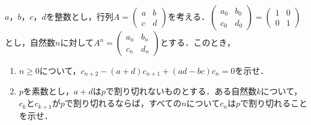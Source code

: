 \documentclass[../../main.tex]{subfiles}
\begin{document}
$a$，$b$，$c$，$d$を整数とし，行列$A=
\begin{pmatrix} a&b \\ c&d
\end{pmatrix}$を考える．$
\begin{pmatrix} a_0&b_0 \\ c_0&d_0
\end{pmatrix}=
\begin{pmatrix} 1&0 \\ 0&1
\end{pmatrix}$とし，自然数$n$に対して$A^n=
\begin{pmatrix} a_n&b_n \\ c_n&d_n
\end{pmatrix}$とする．このとき，

\begin{enumerate}
  \item $n\ge 0$について，$c_{n+2}-(a+d)c_{n+1}+(ad-bc)c_n=0$を示せ．
  \item $p$を素数とし，$a+d$は$p$で割り切れないものとする．ある自然数$k$について，$c_k$と$c_{k+1}$が$p$で割り切れるならば，すべての$n$について$c_n$は$p$で割り切れることを示せ．
\end{enumerate}
\end{document}
